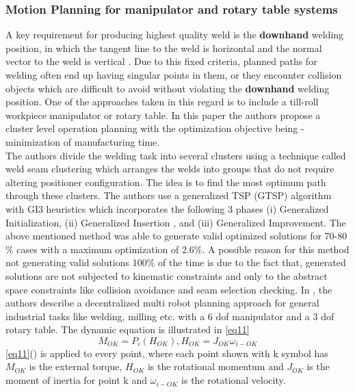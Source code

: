 \subsubsection{Motion Planning for manipulator and rotary table systems}
A key requirement for producing highest quality weld is the \textbf{downhand} welding position, in which the tangent line to the weld is horizontal and the normal vector to the weld is vertical \citet{Dolgui2005}. Due to this fixed criteria, planned paths for welding often end up having singular points in them, or they encounter collision objects which are difficult to avoid without violating the \textbf{downhand} welding position. One of the approaches taken in this regard is to include a till-roll workpiece manipulator or rotary table. In this paper \citet{Dolgui2005} the authors propose a cluster level operation planning with the optimization objective being - minimization of manufacturing time. \\
The authors divide the welding task into several clusters using a technique called weld seam clustering which arranges the welds into groups that do not require altering positioner configuration. The idea is to find the most optimum path through these clusters. The authors use a generalized TSP (GTSP) algorithm with GI3 heuristics which incorporates the following 3 phases (i) Generalized Initialization, (ii) Generalized Insertion , and (iii) Generalized Improvement. The above mentioned method was able to generate valid optimized solutions for 70-80$\%$ cases with a maximum optimization of 2.6$\%$. A possible reason for this method not generating valid solutions 100$\%$ of the time is due to the fact that, generated solutions are not subjected to kinematic constraints and only to the abstract space constraints like collision avoidance and seam selection checking.
In \citet{Dorosti2009}, the authors describe a decentralized multi robot planning approach for general industrial tasks like welding, milling etc. with a 6 dof manipulator and a 3 dof rotary table. The dynamic equation is illustrated in \eqref{eq11}
\begin{equation}
\label{eq11}
M_{OK} = P_{i}(H_{OK}),H_{OK} = J_{OK}\omega_{i - OK}
\end{equation}
\eqref{eq11}(\citet{Dorosti2009}) is applied to every point, where each point shown with k symbol has $M_{OK}$ is the external torque, $H_{OK}$ is the rotational momentum and $J_{OK}$ is the moment of inertia for point k and $\omega_{i - OK}$ is the rotational velocity. 

